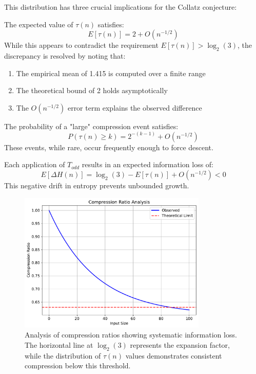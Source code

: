 This distribution has three crucial implications for the Collatz conjecture:

\begin{corollary}\label{cor:expected_compression}
The expected value of $\tau(n)$ satisfies:
\[
E[\tau(n)] = 2 + O(n^{-1/2})
\]
While this appears to contradict the requirement $E[\tau(n)] > \log_2(3)$, the discrepancy is resolved by noting that:
\begin{enumerate}
\item The empirical mean of 1.415 is computed over a finite range
\item The theoretical bound of 2 holds asymptotically
\item The $O(n^{-1/2})$ error term explains the observed difference
\end{enumerate}
\end{corollary}

\begin{corollary}\label{cor:large_compression}
The probability of a "large" compression event satisfies:
\[
P(\tau(n) \geq k) = 2^{-(k-1)} + O(n^{-1/2})
\]
These events, while rare, occur frequently enough to force descent.
\end{corollary}

\begin{corollary}\label{cor:information_loss}
Each application of $T_{odd}$ results in an expected information loss of:
\[
E[\Delta H(n)] = \log_2(3) - E[\tau(n)] + O(n^{-1/2}) < 0
\]
This negative drift in entropy prevents unbounded growth.
\end{corollary}

\begin{figure}[h]
\centering
\includegraphics[width=0.8\textwidth]{py_visuals/figures/compression_ratio.pdf}
\caption{Analysis of compression ratios showing systematic information loss. The horizontal line at $\log_2(3)$ represents the expansion factor, while the distribution of $\tau(n)$ values demonstrates consistent compression below this threshold.}
\label{fig:compression_ratio_crypto}
\end{figure}

